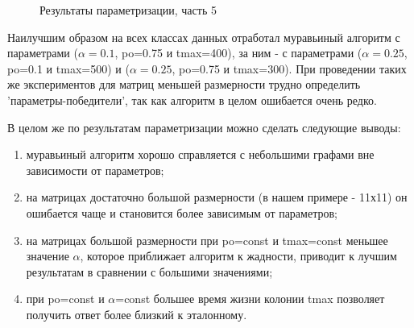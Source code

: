 \clearpage
\begin{figure}[h!]
	
	
	\caption{Результаты параметризации, часть 5}
	
	\label{fig:tab5}
	
\end{figure}

Наилучшим образом на всех классах данных отработал муравьиный алгоритм с параметрами ($\alpha=0.1$, po=0.75 и tmax=400), за ним - с параметрами ($\alpha=0.25$, po=0.1 и tmax=500) и ($\alpha=0.25$, po=0.75 и tmax=300). При проведении таких же экспериментов для матриц меньшей размерности трудно определить 'параметры-победители', так как алгоритм в целом ошибается очень редко.

 В целом же по результатам параметризации можно сделать следующие выводы:
 \begin{enumerate}[label={\arabic*)}]
 	\item муравьиный алгоритм хорошо справляется с небольшими графами вне зависимости от параметров;
 	\item на матрицах достаточно большой размерности (в нашем примере - 11х11) он ошибается чаще и становится более зависимым от параметров;
 	\item на матрицах большой размерности при po=const и tmax=const меньшее значение $\alpha$, которое приближает алгоритм к жадности, приводит к лучшим результатам в сравнении с большими значениями;
 	\item при po=const и $\alpha$=const большее время жизни колонии tmax позволяет получить ответ более близкий к эталонному.
 \end{enumerate}
 


